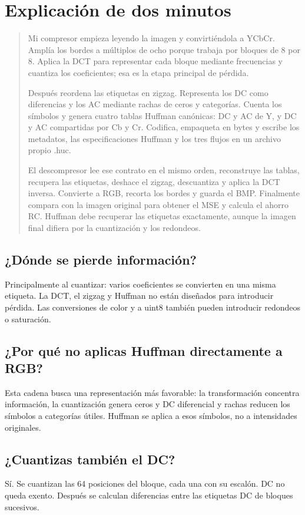 \documentclass[11pt,a4paper,oneside]{report}
\begin{document}
\section{Explicación de dos minutos}

\begin{quote}
Mi compresor empieza leyendo la imagen y convirtiéndola a YCbCr. Amplía los
bordes a múltiplos de ocho porque trabaja por bloques de 8 por 8. Aplica la DCT
para representar cada bloque mediante frecuencias y cuantiza los coeficientes;
esa es la etapa principal de pérdida.

Después reordena las etiquetas en zigzag. Representa los DC como diferencias
y los AC mediante rachas de ceros y categorías. Cuenta los símbolos y genera
cuatro tablas Huffman canónicas: DC y AC de Y, y DC y AC compartidas por Cb y Cr.
Codifica, empaqueta en bytes y escribe los metadatos, las especificaciones
Huffman y los tres flujos en un archivo propio .huc.

El descompresor lee ese contrato en el mismo orden, reconstruye las tablas,
recupera las etiquetas, deshace el zigzag, descuantiza y aplica la DCT inversa.
Convierte a RGB, recorta los bordes y guarda el BMP. Finalmente compara con
la imagen original para obtener el MSE y calcula el ahorro RC. Huffman debe
recuperar las etiquetas exactamente, aunque la imagen final difiera por la
cuantización y los redondeos.
\end{quote}


\subsection{¿Dónde se pierde información?}
Principalmente al cuantizar: varios coeficientes se convierten en una misma etiqueta. La DCT, el zigzag y Huffman no están diseñados para introducir pérdida. Las conversiones de color y a uint8 también pueden introducir redondeos o saturación.

\subsection{¿Por qué no aplicas Huffman directamente a RGB?}
Esta cadena busca una representación más favorable: la transformación concentra información, la cuantización genera ceros y DC diferencial y rachas reducen los símbolos a categorías útiles. Huffman se aplica a esos símbolos, no a intensidades originales.

\subsection{¿Cuantizas también el DC?}
Sí. Se cuantizan las 64 posiciones del bloque, cada una con su escalón. DC no queda exento. Después se calculan diferencias entre las etiquetas DC de bloques sucesivos.
\end{document}
